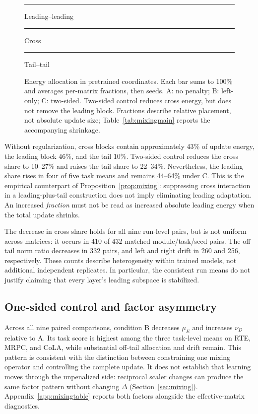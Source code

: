 \begin{figure}[t]
\centering
\par\smallskip
{\small\textcolor{black!80}{\rule{1em}{1ex}} Leading--leading\quad
\textcolor{black!45}{\rule{1em}{1ex}} Cross\quad
\textcolor{black!15}{\rule{1em}{1ex}} Tail--tail}
\caption{Energy allocation in pretrained coordinates. Each bar sums to 100\% and averages per-matrix fractions, then seeds. A: no penalty; B: left-only; C: two-sided. Two-sided control reduces cross energy, but does not remove the leading block. Fractions describe relative placement, not absolute update size; Table~\ref{tab:mixingmain} reports the accompanying shrinkage.}
\label{fig:allocation}
\end{figure}

Without regularization, cross blocks contain approximately 43\% of update energy, the leading block 46\%, and the tail 10\%. Two-sided control reduces the cross share to 10--27\% and raises the tail share to 22--34\%. Nevertheless, the leading share rises in four of five task means and remains 44--64\% under C. This is the empirical counterpart of Proposition~\ref{prop:mixing}: suppressing cross interaction in a leading-plus-tail construction does not imply eliminating leading adaptation. An increased \emph{fraction} must not be read as increased absolute leading energy when the total update shrinks.

The decrease in cross share holds for all nine run-level pairs, but is not uniform across matrices: it occurs in 410 of 432 matched module/task/seed pairs. The off-tail norm ratio decreases in 332 pairs, and left and right drift in 260 and 256, respectively. These counts describe heterogeneity within trained models, not additional independent replicates. In particular, the consistent run means do not justify claiming that every layer's leading subspace is stabilized.

\subsection{One-sided control and factor asymmetry}
Across all nine paired comparisons, condition B decreases $\mu_E$ and increases $\nu_D$ relative to A. Its task score is highest among the three task-level means on RTE, MRPC, and CoLA, while substantial off-tail allocation and drift remain. This pattern is consistent with the distinction between constraining one mixing operator and controlling the complete update. It does not establish that learning moves through the unpenalized side: reciprocal scaler changes can produce the same factor pattern without changing $\Delta$ (Section~\ref{sec:mixing}). Appendix~\ref{app:mixingtable} reports both factors alongside the effective-matrix diagnostics.

